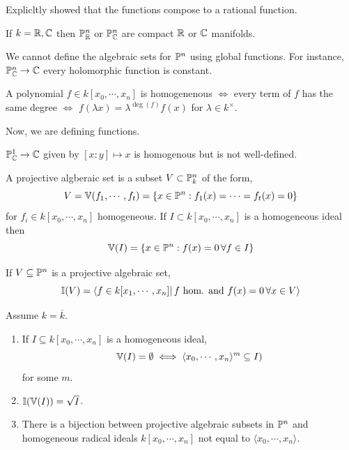 \documentclass[12pt]{amsart}
\begin{document}
\begin{example}
    Explicltly showed that the functions compose to a rational function. 
\end{example}

\begin{theorem}[Fact.]
    If $k = \R, \C$ then $\P^n_\R$ or $\P^n_\C$ are compact $\R$ or $\C$ manifolds. 
\end{theorem}

We cannot define the algebraic sets for $\P^n$ using global functions. For instance, $\P^n_\C \to \C$ every holomorphic function is constant. 

\begin{definition}
    A polynomial $f \in k[x_0, \cdots, x_n]$ is homogenenous $\iff$ every term of $f$ has the same degree $\iff$ $f(\lambda x) = \lambda^{\deg(f)}f(x)$ for $\lambda \in k^\times$. 
\end{definition}

Now, we are defining functions. 
\begin{example}
    $\P^1_\C \to \C$ given by $[x: y] \mapsto x$ is homogenous but is not well-defined. 
\end{example}

\begin{definition}
    A projective algberaic set is a subset $V \subset \P^n_k$ of the form, 
    \[ V = \V(f_1, \cdots, f_t) = \{ x \in \P^n : f_1(x) = \cdots = f_t(x) = 0 \}\]
    for $f_i \in k[x_0, \cdots, x_n]$ homogeneous.  
    If $I \subset k[x_0, \cdots, x_n]$ is a homogeneous ideal then
    \[ \V(I) = \{ x \in \P^n : f(x) = 0 \, \forall f \in I\}\]
\end{definition}

\begin{definition}
    If $V \subseteq \P^n$ is a projective algebraic set, 
    \[ \I(V) = \langle f \in k[x_1, \cdots, x_n] | \, f \text{ hom. and } f(x) = 0 \, \forall x \in V\rangle \]
\end{definition}

\begin{theorem}
    Assume $k = \overline{k}$. 
    \begin{enumerate}
        \item If $I \subseteq k[x_0, \cdots, x_n]$ is a homogeneous ideal,
        \[ \V(I) = \emptyset \iff \langle x_0, \cdots, x_n \rangle^m \subseteq I)\]
        for some $m$.  
        \item $\I(\V(I)) = \sqrt{I}$. 
        \item There is a bijection between projective algebraic subsets in $\P^n$ and homogeneous radical ideals $k[x_0, \cdots, x_n]$ not equal to $\langle x_0, \cdots, x_n \rangle$. 
    \end{enumerate}
\end{theorem}
\end{document}
